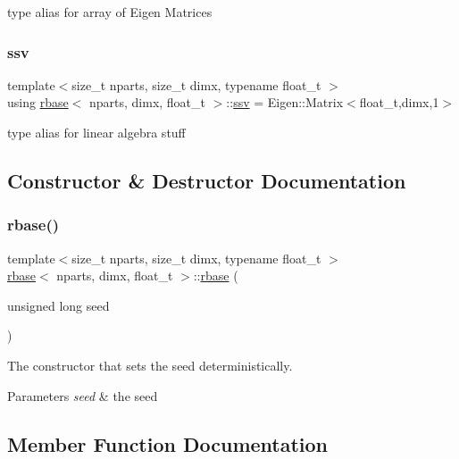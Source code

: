 type alias for array of Eigen Matrices \mbox{\label{classrbase_ae20e0b8df15aa109252f57ecbf1f20f8}} 
\subsubsection{\texorpdfstring{ssv}{ssv}}
{\footnotesize\ttfamily template$<$size\+\_\+t nparts, size\+\_\+t dimx, typename float\+\_\+t $>$ \\
using \hyperlink{classrbase}{rbase}$<$ nparts, dimx, float\+\_\+t $>$\+::\hyperlink{classrbase_ae20e0b8df15aa109252f57ecbf1f20f8}{ssv} =  Eigen\+::\+Matrix$<$float\+\_\+t,dimx,1$>$}

type alias for linear algebra stuff 

\subsection{Constructor \& Destructor Documentation}
\mbox{\label{classrbase_a63220b39e2569072713847e7bdb585bf}} 
\subsubsection{\texorpdfstring{rbase()}{rbase()}}
{\footnotesize\ttfamily template$<$size\+\_\+t nparts, size\+\_\+t dimx, typename float\+\_\+t $>$ \\
\hyperlink{classrbase}{rbase}$<$ nparts, dimx, float\+\_\+t $>$\+::\hyperlink{classrbase}{rbase} (\begin{DoxyParamCaption}\item[{unsigned long}]{seed }\end{DoxyParamCaption})}



The constructor that sets the seed deterministically. 


\begin{DoxyParams}{Parameters}
{\em seed} & the seed \\
\hline
\end{DoxyParams}


\subsection{Member Function Documentation}
\mbox{\label{classrbase_aff0f6f88fd4656e67f5ebc870f10dd44}} 
